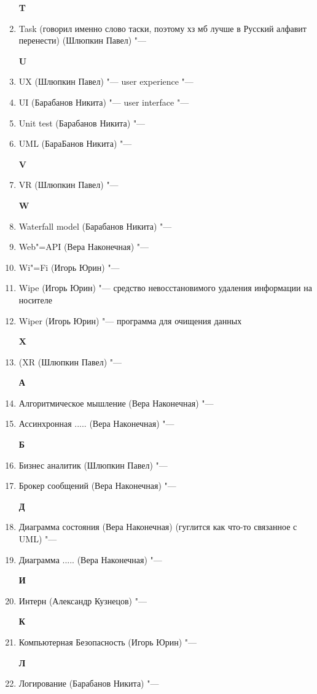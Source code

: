 \documentclass{article}
\begin{document}
\begin{enumerate}
    \textbf{T}
    \item {Task (говорил именно слово таски, поэтому хз мб лучше в Русский алфавит перенести) (Шлюпкин Павел) "--- }

    \textbf{U}
    \item {UX (Шлюпкин Павел) "--- user experience "---}
    \item {UI (Барабанов Никита) "--- user interface "---}
    \item {Unit test (Барабанов Никита) "---}
    \item {UML (БараБанов Никита) "--- }

    \textbf{V}
    \item {VR (Шлюпкин Павел) "--- }

    \textbf{W}
    \item {Waterfall model (Барабанов Никита) "--- }
    \item {Web"=API (Вера Наконечная) "---}
    \item {Wi"=Fi (Игорь Юрин) "---}
    \item {Wipe (Игорь Юрин) "--- средство невосстановимого удаления информации на носителе}
    \item {Wiper (Игорь Юрин) "--- программа для очищения данных }
    
    
    \textbf{X}
    \item {(XR (Шлюпкин Павел) "---}
    
    \textbf{А}
    \item {Алгоритмическое мышление (Вера Наконечная) "---}
    \item {Ассинхронная ..... (Вера Наконечная) "---}

    
    \textbf{Б}
    \item {Бизнес аналитик (Шлюпкин Павел) "---}
    \item {Брокер сообщений (Вера Наконечная) "---}
    

    \textbf{Д}
    \item {Диаграмма состояния (Вера Наконечная) (гуглится как что-то связанное с UML) "--- }
    \item {Диаграмма ..... (Вера Наконечная) "--- }

    \textbf{И}
    \item {Интерн (Александр Кузнецов) "--- }

    \textbf{К}
    \item {Компьютерная Безопасность (Игорь Юрин) "--- }

    \textbf{Л}
    \item {Логирование (Барабанов Никита) "---}


\end{enumerate}
\end{document}
